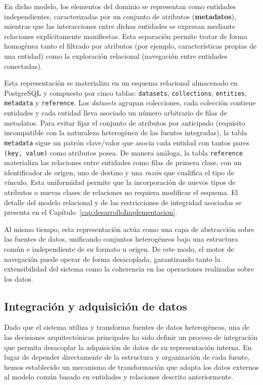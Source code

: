 En dicho modelo, los elementos del dominio se representan como entidades independientes, caracterizadas
por un conjunto de atributos (\textbf{metadatos}), mientras que las interacciones entre dichas entidades se
expresan mediante relaciones explícitamente manifiestas. Esta separación permite tratar de forma homogénea tanto el
filtrado por atributos (por ejemplo, características propias de una entidad) como la exploración
relacional (navegación entre entidades conectadas).

Esta representación se materializa en un esquema relacional almacenado en
PostgreSQL y compuesto por cinco tablas: \texttt{datasets},
\texttt{collections}, \texttt{entities}, \texttt{metadata} y
\texttt{reference}. Los \textit{datasets} agrupan colecciones, cada
colección contiene entidades y cada entidad lleva asociado un número
arbitrario de filas de metadatos. Para evitar fijar el conjunto de
atributos por anticipado (requisito incompatible con la naturaleza
heterogénea de las fuentes integradas), la tabla \texttt{metadata}
sigue un patrón clave/valor que asocia cada entidad con tantos pares
\texttt{(key, value)} como atributos posea. De manera análoga, la tabla
\texttt{reference} materializa las relaciones entre entidades como filas de
primera clase, con un identificador de origen, uno de destino y una
\textit{razón} que cualifica el tipo de vínculo. Esta uniformidad permite
que la incorporación de nuevos tipos de atributos o nuevas clases de
relaciones no requiera modificar el esquema. El detalle del modelo
relacional y de las restricciones de integridad asociadas se presenta en
el Capítulo~\ref{cap:desarrolloImplementacion}.

Al mismo tiempo, esta representación actúa como una capa de abstracción sobre las fuentes de
datos, unificando conjuntos heterogéneos bajo una estructura común e independiente de su formato u origen.
De este modo, el motor de navegación puede operar de forma desacoplada, garantizando tanto la extensibilidad
del sistema como la coherencia en las operaciones realizadas sobre los datos.

    \subsection*{Integración y adquisición de datos}

Dado que el sistema utiliza y transforma fuentes de datos heterogéneas, una de las decisiones
arquitectónicas principales ha sido definir un proceso de integración que permita desacoplar la
adquisición de datos de su representación interna. En lugar de depender directamente de la estructura
y organización de cada fuente, hemos establecido un mecanismo de transformación que adapta los datos
externos al modelo común basado en entidades y relaciones descrito anteriormente.

